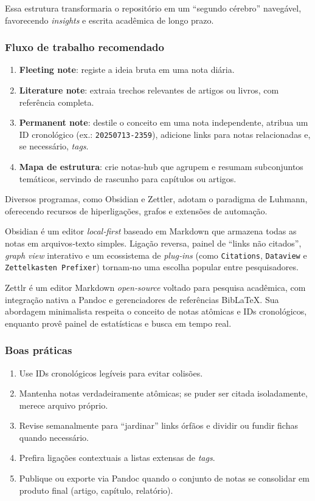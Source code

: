 Essa estrutura transformaria o repositório em um ``segundo cérebro'' navegável, favorecendo \textit{insights} e escrita acadêmica de longo prazo.

\subsubsection{Fluxo de trabalho recomendado}

\begin{enumerate}
  \item \textbf{Fleeting note}: registe a ideia bruta em uma nota diária.  
  \item \textbf{Literature note}: extraia trechos relevantes de artigos ou livros, com referência completa.  
  \item \textbf{Permanent note}: destile o conceito em uma nota independente, atribua um ID cronológico (ex.: \texttt{20250713‑2359}), adicione links para notas relacionadas e, se necessário, \emph{tags}.  
  \item \textbf{Mapa de estrutura}: crie notas‑hub que agrupem e resumam subconjuntos temáticos, servindo de rascunho para capítulos ou artigos.
\end{enumerate}

Diversos programas, como Obsidian e Zettler, adotam o paradigma de Luhmann, oferecendo recursos de hiperligações, grafos e extensões de automação. 

Obsidian é um editor \emph{local‑first} baseado em Markdown que armazena todas as notas em arquivos‑texto simples\citep{obsidianGraphView}.  
Ligação reversa, painel de “links não citados”, \emph{graph view} interativo e um ecossistema de \emph{plug‑ins} (como \texttt{Citations}, \texttt{Dataview} e \texttt{Zettelkasten Prefixer}) tornam‑no uma escolha popular entre pesquisadores.

Zettlr é um editor Markdown \emph{open‑source} voltado para pesquisa acadêmica, com integração nativa a Pandoc e gerenciadores de referências BibLaTeX.  
Sua abordagem minimalista respeita o conceito de notas atômicas e IDs cronológicos, enquanto provê painel de estatísticas e busca em tempo real\citep{zettlrGuide}.



\subsubsection{Boas práticas}

\begin{enumerate}
  \item Use IDs cronológicos legíveis para evitar colisões.  
  \item Mantenha notas verdadeiramente atômicas; se puder ser citada isoladamente, merece arquivo próprio.  
  \item Revise semanalmente para “jardinar” links órfãos e dividir ou fundir fichas quando necessário.  
  \item Prefira ligações contextuais a listas extensas de \emph{tags}.  
  \item Publique ou exporte via Pandoc quando o conjunto de notas se consolidar em produto final (artigo, capítulo, relatório).
\end{enumerate}


